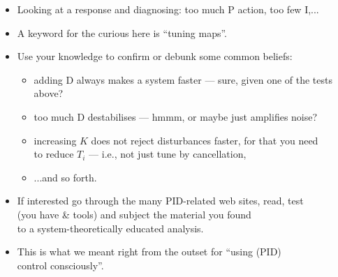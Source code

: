 \begin{frame}[fragile]
\myPause
 \begin{itemize}[<+-| alert@+>]
 \item Looking at a response and diagnosing: too much P action, too few I,...
 \item A keyword for the curious here is ``tuning maps''.
 \item \vspace{2mm} Use your  knowledge to confirm or debunk some common beliefs:
       \begin{itemize}[<+-| alert@+>]
       \item adding D always makes a system faster --- sure, given one of the tests above?
       \item too much D destabilises --- hmmm, or maybe just amplifies noise?
       \item increasing $K$ does not reject disturbances faster, for that you need\\
             to reduce $T_i$ --- i.e., not just tune by cancellation,
       \item ...and so forth.
       \end{itemize}
 \item If interested go through the many PID-related web sites, read, test\\
       (you have  \& tools) and subject the material you found\\
       to a system-theoretically educated analysis.
 \item This is what we meant right from the outset for ``using (PID)\\
       control consciously''. 
 \end{itemize}
\end{frame}



